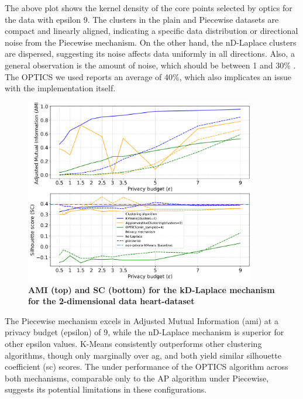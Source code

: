 The above plot shows the kernel density of the core points selected by \gls{optics} for the data with epsilon 9. The clusters in the plain and Piecewise datasets are compact and linearly aligned, indicating a specific data distribution or directional noise from the Piecewise mechanism. On the other hand, the nD-Laplace clusters are dispersed, suggesting its noise affects data uniformly in all directions.
Also,  a general observation is the amount of noise, which should be between  1 and 30\% \citep{schubert_dbscan_2017}. The OPTICS we used reports an average of 40\%, which also implicates an issue with the implementation itself.


\newpage
\begin{figure}[H]
  \centering
  \caption{\textbf{AMI (top) and SC (bottom) for the kD-Laplace mechanism for the 2-dimensional data heart-dataset}}
  \includegraphics[width=0.9\textwidth]{Results/kd-laplace/kd-Laplace/heart-dataset/ami-and-sc_2_dimensions.png}

  \label{fig:validation-heart-dataset_comparison_2d-laplace}
\end{figure}
The Piecewise mechanism excels in Adjusted Mutual Information (\gls{ami}) at a privacy budget (epsilon) of 9, while the nD-Laplace mechanism is superior for other epsilon values. K-Means consistently outperforms other clustering algorithms, though only marginally over \gls{ag}, and both yield similar silhouette coefficient (\gls{sc}) scores. The under performance of the OPTICS algorithm across both mechanisms, comparable only to the AP algorithm under Piecewise, suggests its potential limitations in these configurations.
\newpage
